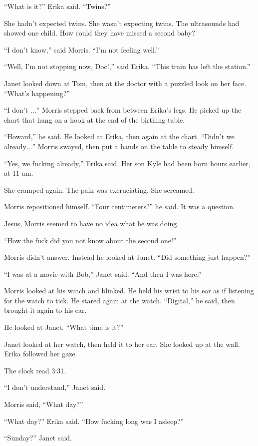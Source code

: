 ``What is it?'' Erika said. ``Twins?''

She hadn't expected twins. She wasn't expecting twins. The ultrasounds had showed one child. How could they have missed a second baby?

``I don't know,'' said Morris. ``I'm not feeling well.''

``Well, I'm not stopping now, Doc!,'' said Erika. ``This train has left the station.''

Janet looked down at Tom, then at the doctor with a puzzled look on her face. ``What's happening?''

``I don't $\ldots$'' Morris stepped back from between Erika's legs. He picked up the chart that hung on a hook at the end of the birthing table.

``Howard,'' he said. He looked at Erika, then again at the chart. ``Didn't we already$\ldots$'' Morris swayed, then put a hands on the table to steady himself.

``Yes, we fucking already,'' Erika said. Her son Kyle had been born hours earlier, at 11 am.

She cramped again. The pain was excruciating. She screamed.

Morris repositioned himself. ``Four centimeters?'' he said. It was a question.

Jesus, Morris seemed to have no idea what he was doing.

``How the fuck did you not know about the second one!''

Morris didn't answer. Instead he looked at Janet. ``Did something just happen?''

``I was at a movie with Bob,'' Janet said. ``And then I was here.''

Morris looked at his watch and blinked. He held his wrist to his ear as if listening for the watch to tick. He stared again at the watch. ``Digital,'' he said, then brought it again to his ear.

He looked at Janet. ``What time is it?''

Janet looked at her watch, then held it to her ear. She looked up at the wall. Erika followed her gaze.

The clock read 3:31.

``I don't understand,'' Janet said.

Morris said, ``What day?''

``What day?'' Erika said. ``How fucking long was I asleep?''

``Sunday?'' Janet said.

